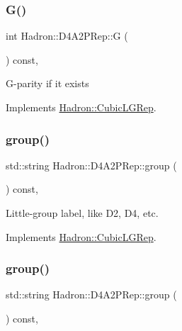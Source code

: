 \subsubsection{\texorpdfstring{G()}{G()}\hspace{0.1cm}{\footnotesize\ttfamily [2/2]}}
{\footnotesize\ttfamily int Hadron\+::\+D4\+A2\+P\+Rep\+::G (\begin{DoxyParamCaption}{ }\end{DoxyParamCaption}) const\hspace{0.3cm}{\ttfamily [inline]}, {\ttfamily [virtual]}}

G-\/parity if it exists 

Implements \mbox{\hyperlink{structHadron_1_1CubicLGRep_ace26f7b2d55e3a668a14cb9026da5231}{Hadron\+::\+Cubic\+L\+G\+Rep}}.

\mbox{\label{structHadron_1_1D4A2PRep_aec02eb83b025cab9d6a38554361f3f90}} 
\subsubsection{\texorpdfstring{group()}{group()}\hspace{0.1cm}{\footnotesize\ttfamily [1/2]}}
{\footnotesize\ttfamily std\+::string Hadron\+::\+D4\+A2\+P\+Rep\+::group (\begin{DoxyParamCaption}{ }\end{DoxyParamCaption}) const\hspace{0.3cm}{\ttfamily [inline]}, {\ttfamily [virtual]}}

Little-\/group label, like D2, D4, etc. 

Implements \mbox{\hyperlink{structHadron_1_1CubicLGRep_a9bdb14b519a611d21379ed96a3a9eb41}{Hadron\+::\+Cubic\+L\+G\+Rep}}.

\mbox{\label{structHadron_1_1D4A2PRep_aec02eb83b025cab9d6a38554361f3f90}} 
\subsubsection{\texorpdfstring{group()}{group()}\hspace{0.1cm}{\footnotesize\ttfamily [2/2]}}
{\footnotesize\ttfamily std\+::string Hadron\+::\+D4\+A2\+P\+Rep\+::group (\begin{DoxyParamCaption}{ }\end{DoxyParamCaption}) const\hspace{0.3cm}{\ttfamily [inline]}, {\ttfamily [virtual]}}

